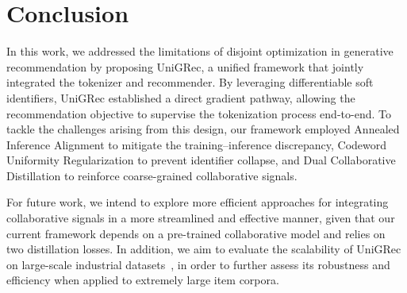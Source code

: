 \section{Conclusion}
\label{sec:conclusion}

In this work, we addressed the limitations of disjoint optimization in generative recommendation by proposing UniGRec, a unified framework that jointly integrated the tokenizer and recommender. By leveraging differentiable soft identifiers, UniGRec established a direct gradient pathway, allowing the recommendation objective to supervise the tokenization process end-to-end. To tackle the challenges arising from this design, our framework employed Annealed Inference Alignment to mitigate the training–inference discrepancy, Codeword Uniformity Regularization to prevent identifier collapse, and Dual Collaborative Distillation to reinforce coarse-grained collaborative signals.

For future work, we intend to explore more efficient approaches for integrating collaborative signals in a more streamlined and effective manner, given that our current framework depends on a pre-trained collaborative model and relies on two distillation losses. In addition, we aim to evaluate the scalability of UniGRec on large-scale industrial datasets~\cite{fu2025forge}, in order to further assess its robustness and efficiency when applied to extremely large item corpora.